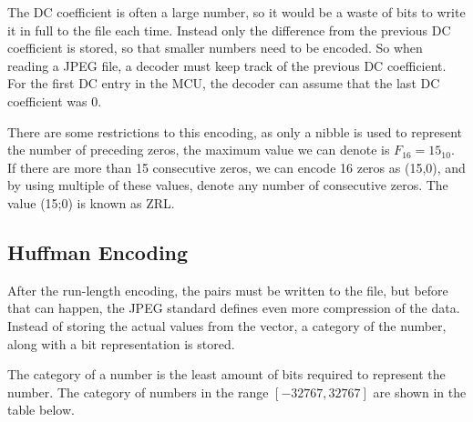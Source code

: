 \begin{infobox}
The DC coefficient is often a large number, so it would be a waste of bits to write it in full to the file each time. Instead only the difference from the previous DC coefficient is stored, so that smaller numbers need to be encoded. So when reading a JPEG file, a decoder must keep track of the previous DC coefficient. For the first DC entry in the MCU, the decoder can assume that the last DC coefficient was 0.

There are some restrictions to this encoding, as only a nibble is used to represent the number of preceding zeros, the maximum value we can denote is $F_{16}=15_{10}$.
If there are more than 15 consecutive zeros, we can encode 16 zeros as (15,0), and by using multiple of these values, denote any number of consecutive zeros. The value (15;0) is known as ZRL. 

\vspace{4mm}
\subsection{Huffman Encoding}
\vspace{-2.5mm}
After the run-length encoding, the pairs must be written to the file, but before that can happen, the JPEG standard defines even more compression of the data. Instead of storing the actual values from the vector, a category of the number, along with a bit representation is stored. 

The category of a number is the least amount of bits required to represent the number. The category of numbers in the range $[-32767, 32767]$ are shown in the table below.

\begin{centering}
\end{centering}


\end{infobox}
